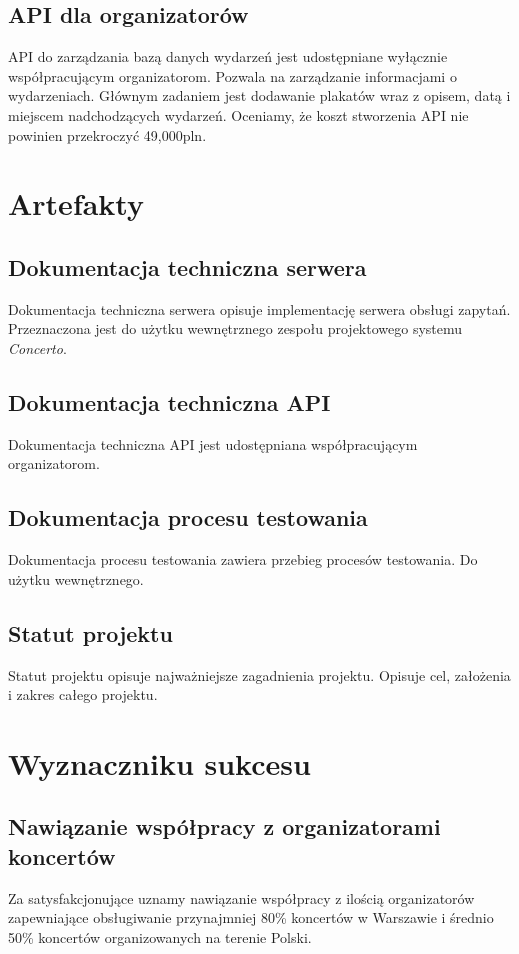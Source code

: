 \documentclass[10pt]{dokument-ppi}
\begin{document}
\subsection{API dla organizatorów}
API do zarządzania bazą danych wydarzeń jest udostępniane wyłącznie
współpracującym organizatorom. Pozwala na zarządzanie informacjami o
wydarzeniach. Głównym zadaniem jest dodawanie plakatów wraz z opisem, datą i
miejscem nadchodzących wydarzeń. Oceniamy, że koszt stworzenia API nie powinien
przekroczyć 49,000pln.


\section{Artefakty}

\subsection{Dokumentacja techniczna serwera}
Dokumentacja techniczna serwera opisuje implementację serwera obsługi
zapytań. Przeznaczona jest do użytku wewnętrznego zespołu projektowego systemu
\emph{Concerto}.

\subsection{Dokumentacja techniczna API}
Dokumentacja techniczna API jest udostępniana współpracującym organizatorom.

\subsection{Dokumentacja procesu testowania}
Dokumentacja procesu testowania zawiera przebieg procesów testowania. Do użytku
wewnętrznego.

\subsection{Statut projektu}
Statut projektu opisuje najważniejsze zagadnienia projektu. Opisuje cel,
założenia i zakres całego projektu.


\section{Wyznaczniku sukcesu}

\subsection{Nawiązanie współpracy z organizatorami koncertów}
Za satysfakcjonujące uznamy nawiązanie współpracy z ilością organizatorów
zapewniające obsługiwanie przynajmniej 80\% koncertów w Warszawie i średnio 50\%
koncertów organizowanych na terenie Polski.
\end{document}

